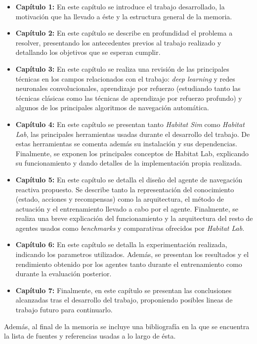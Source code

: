 \begin{itemize}
	\item \textbf{Capítulo 1:} En este capítulo se introduce el trabajo desarrollado, la motivación que ha llevado a éste y la estructura general de la memoria.
	\item \textbf{Capítulo 2:} En este capítulo se describe en profundidad el problema a resolver, presentando los antecedentes previos al trabajo realizado y detallando los objetivos que se esperan cumplir.
	\item \textbf{Capítulo 3:} En este capítulo se realiza una revisión de las principales técnicas en los campos relacionados con el trabajo: \textit{deep learning} y redes neuronales convolucionales, aprendizaje por refuerzo (estudiando tanto las técnicas clásicas como las técnicas de aprendizaje por refuerzo profundo) y algunos de los principales algoritmos de navegación automática.
	\item \textbf{Capítulo 4:} En este capítulo se presentan tanto \textit{Habitat Sim} como \textit{Habitat Lab}, las principales herramientas usadas durante el desarrollo del trabajo. De estas herramientas se comenta además su instalación y sus dependencias. Finalmente, se exponen los principales conceptos de Habitat Lab, explicando su funcionamiento y dando detalles de la implementación propia realizada.
	\item \textbf{Capítulo 5:} En este capítulo se detalla el diseño del agente de navegación reactiva propuesto. Se describe tanto la representación del conocimiento (estado, acciones y recompensas) como la arquitectura, el método de actuación y el entrenamiento llevado a cabo por el agente. Finalmente, se realiza una breve explicación del funcionamiento y la arquitectura del resto de agentes usados como \textit{benchmarks} y comparativas ofrecidos por \textit{Habitat Lab}.
	\item \textbf{Capítulo 6:} En este capítulo se detalla la experimentación realizada, indicando los parametros utilizados. Además, se presentan los resultados y el rendimiento obtenido por los agentes tanto durante el entrenamiento como durante la evaluación posterior.
	\item \textbf{Capítulo 7:} Finalmente, en este capítulo se presentan las conclusiones alcanzadas tras el desarrollo del trabajo, proponiendo posibles lineas de trabajo futuro para continuarlo.
\end{itemize}

Además, al final de la memoria se incluye una bibliografía en la que se encuentra la lista de fuentes y referencias usadas a lo largo de ésta.

